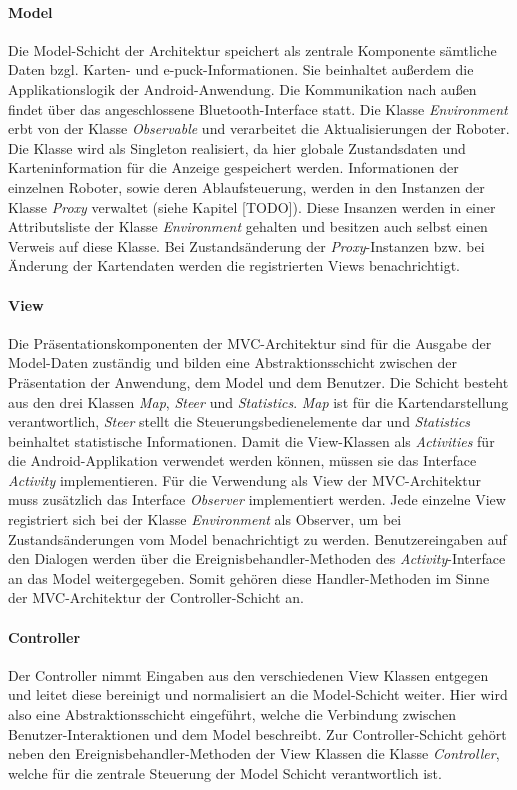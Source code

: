 \documentclass[10pt,a4paper]{article}
\begin{document}
			\paragraph*{Model}
  				Die Model-Schicht der Architektur speichert als zentrale Komponente sämtliche Daten bzgl. Karten- und e-puck-Informationen. 
  				Sie beinhaltet außerdem die Applikationslogik der Android-Anwendung. Die Kommunikation nach außen findet über das
  				angeschlossene Bluetooth-Interface statt. Die Klasse \textit{Environment} erbt von der Klasse \textit{Observable} und verarbeitet
  				die Aktualisierungen der Roboter. Die Klasse wird als Singleton realisiert, da hier globale Zustandsdaten und Karteninformation
  				für die Anzeige gespeichert werden. Informationen der einzelnen Roboter, sowie deren Ablaufsteuerung, werden in den Instanzen
  				der Klasse \textit{Proxy} verwaltet (siehe Kapitel [TODO]). Diese Insanzen werden in einer Attributsliste der Klasse \textit{Environment}
  				gehalten und besitzen auch selbst einen Verweis auf diese Klasse. Bei Zustandsänderung der \textit{Proxy}-Instanzen bzw. bei
  				Änderung der Kartendaten werden die registrierten Views benachrichtigt.
  			\paragraph*{View}
  				Die Präsentationskomponenten der MVC-Architektur sind für die Ausgabe der Model-Daten zuständig und bilden eine
  				Abstraktionsschicht zwischen der Präsentation der Anwendung, dem Model und dem Benutzer. Die Schicht besteht aus den drei
  				Klassen	\textit{Map}, \textit{Steer} und \textit{Statistics}. \textit{Map} ist für die Kartendarstellung
  				verantwortlich, \textit{Steer} stellt die Steuerungsbedienelemente dar und \textit{Statistics} beinhaltet statistische
  				Informationen.  Damit die View-Klassen als \textit{Activities} für die Android-Applikation verwendet werden können, müssen sie
  				das Interface \textit{Activity} implementieren. Für die Verwendung als View der MVC-Architektur muss zusätzlich das Interface
  				\textit{Observer} implementiert werden. Jede einzelne View registriert sich bei der Klasse \textit{Environment} als Observer,
  				um bei Zustandsänderungen vom Model benachrichtigt zu werden. Benutzereingaben auf den Dialogen werden über
  				die Ereignisbehandler-Methoden des \textit{Activity}-Interface an das Model weitergegeben. Somit gehören diese Handler-Methoden
  				im Sinne der MVC-Architektur der Controller-Schicht an.
  			\paragraph*{Controller}
  				Der Controller nimmt Eingaben aus den verschiedenen View Klassen entgegen und leitet diese bereinigt und normalisiert an die
  				Model-Schicht weiter. Hier wird also eine Abstraktionsschicht eingeführt, welche die Verbindung zwischen Benutzer-Interaktionen
  				und dem Model beschreibt. Zur Controller-Schicht gehört neben den Ereignisbehandler-Methoden der View Klassen die Klasse
  				\textit{Controller}, welche für die zentrale Steuerung der Model Schicht verantwortlich ist.
  				
\end{document}
